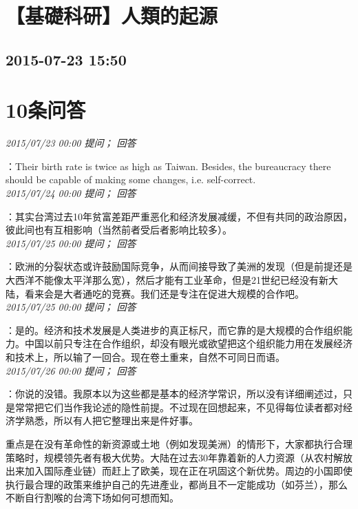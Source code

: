 \documentclass[twocolumn]{ctexart}
\begin{document}
\section{【基礎科研】人類的起源}
\subsection{2015-07-23 15:50}


\section{10条问答}

\textit{\hfill\noindent\small 2015/07/23 00:00 提问； 回答}

：Their birth rate is twice as high as Taiwan. Besides, the bureaucracy there should be capable of making some changes, i.e. self-correct.\\

\textit{\hfill\noindent\small 2015/07/24 00:00 提问； 回答}

：其实台湾过去10年贫富差距严重恶化和经济发展减缓，不但有共同的政治原因，彼此间也有互相影响（当然前者受后者影响比较多）。\\

\textit{\hfill\noindent\small 2015/07/25 00:00 提问； 回答}

：欧洲的分裂状态或许鼓励国际竞争，从而间接导致了美洲的发现（但是前提还是大西洋不能像太平洋那么宽），然后才能有工业革命，但是21世纪已经没有新大陆，看来会是大者通吃的竞赛。我们还是专注在促进大规模的合作吧。\\

\textit{\hfill\noindent\small 2015/07/25 00:00 提问； 回答}

：是的。经济和技术发展是人类进步的真正标尺，而它靠的是大规模的合作组织能力。中国以前只专注在合作组织，却没有眼光或欲望把这个组织能力用在发展经济和技术上，所以输了一回合。现在卷土重来，自然不可同日而语。\\

\textit{\hfill\noindent\small 2015/07/26 00:00 提问； 回答}

：你说的没错。我原本以为这些都是基本的经济学常识，所以没有详细阐述过，只是常常把它们当作我论述的隐性前提。不过现在回想起来，不见得每位读者都对经济学熟悉，所以有人把它整理出来是件好事。

重点是在没有革命性的新资源或土地（例如发现美洲）的情形下，大家都执行合理策略时，规模领先者有极大优势。大陆在过去30年靠着新的人力资源（从农村解放出来加入国际產业链）而赶上了欧美，现在正在巩固这个新优势。周边的小国即使执行最合理的政策来维护自己的先进產业，都尚且不一定能成功（如芬兰），那么不断自行割喉的台湾下场如何可想而知。\\
\end{document}
